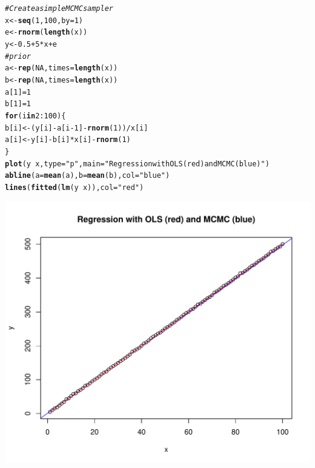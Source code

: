 \documentclass[12pt, a4paper, oneside]{article}\usepackage[]{graphicx}\usepackage[]{color}
\makeatletter
\def\maxwidth{ %
  \ifdim\Gin@nat@width>\linewidth
    \linewidth
  \else
    \Gin@nat@width
  \fi
}
\newcommand{\hlnum}[1]{\textcolor[rgb]{0.686,0.059,0.569}{#1}}%
\newcommand{\hlstr}[1]{\textcolor[rgb]{0.192,0.494,0.8}{#1}}%
\newcommand{\hlcom}[1]{\textcolor[rgb]{0.678,0.584,0.686}{\textit{#1}}}%
\newcommand{\hlopt}[1]{\textcolor[rgb]{0,0,0}{#1}}%
\newcommand{\hlstd}[1]{\textcolor[rgb]{0.345,0.345,0.345}{#1}}%
\newcommand{\hlkwa}[1]{\textcolor[rgb]{0.161,0.373,0.58}{\textbf{#1}}}%
\newcommand{\hlkwb}[1]{\textcolor[rgb]{0.69,0.353,0.396}{#1}}%
\newcommand{\hlkwc}[1]{\textcolor[rgb]{0.333,0.667,0.333}{#1}}%
\newcommand{\hlkwd}[1]{\textcolor[rgb]{0.737,0.353,0.396}{\textbf{#1}}}%
\newenvironment{kframe}{%
 \def\at@end@of@kframe{}%
 \ifinner\ifhmode%
  \def\at@end@of@kframe{\end{minipage}}%
  \begin{minipage}{\columnwidth}%
 \fi\fi%
 \def\FrameCommand##1{\hskip\@totalleftmargin \hskip-\fboxsep
 \colorbox{shadecolor}{##1}\hskip-\fboxsep
     \hskip-\linewidth \hskip-\@totalleftmargin \hskip\columnwidth}%
 \MakeFramed {\advance\hsize-\width
   \@totalleftmargin\z@ \linewidth\hsize
   \@setminipage}}%
 {\par\unskip\endMakeFramed%
 \at@end@of@kframe}
\newenvironment{knitrout}{}{} %
\makeatother
\begin{document}
\begin{knitrout}
\color{fgcolor}\begin{kframe}
\begin{alltt}
\hlcom{# Create a simple MCMC sampler}
\hlstd{x} \hlkwb{<-} \hlkwd{seq}\hlstd{(}\hlnum{1}\hlstd{,} \hlnum{100}\hlstd{,} \hlkwc{by} \hlstd{=} \hlnum{1}\hlstd{)}
\hlstd{e} \hlkwb{<-} \hlkwd{rnorm}\hlstd{(}\hlkwd{length}\hlstd{(x))}
\hlstd{y} \hlkwb{<-} \hlnum{0.5} \hlopt{+} \hlnum{5} \hlopt{*} \hlstd{x} \hlopt{+} \hlstd{e}
\hlcom{# prior}
\hlstd{a} \hlkwb{<-} \hlkwd{rep}\hlstd{(}\hlnum{NA}\hlstd{,} \hlkwc{times} \hlstd{=} \hlkwd{length}\hlstd{(x))}
\hlstd{b} \hlkwb{<-} \hlkwd{rep}\hlstd{(}\hlnum{NA}\hlstd{,} \hlkwc{times} \hlstd{=} \hlkwd{length}\hlstd{(x))}
\hlstd{a[}\hlnum{1}\hlstd{]} \hlkwb{=} \hlnum{1}
\hlstd{b[}\hlnum{1}\hlstd{]} \hlkwb{=} \hlnum{1}
\hlkwa{for} \hlstd{(i} \hlkwa{in} \hlnum{2}\hlopt{:}\hlnum{100}\hlstd{) \{}
    \hlstd{b[i]} \hlkwb{<-} \hlstd{(y[i]} \hlopt{-} \hlstd{a[i} \hlopt{-} \hlnum{1}\hlstd{]} \hlopt{-} \hlkwd{rnorm}\hlstd{(}\hlnum{1}\hlstd{))}\hlopt{/}\hlstd{x[i]}
    \hlstd{a[i]} \hlkwb{<-} \hlstd{y[i]} \hlopt{-} \hlstd{b[i]} \hlopt{*} \hlstd{x[i]} \hlopt{-} \hlkwd{rnorm}\hlstd{(}\hlnum{1}\hlstd{)}
\hlstd{\}}
\hlkwd{plot}\hlstd{(y} \hlopt{~} \hlstd{x,} \hlkwc{type} \hlstd{=} \hlstr{"p"}\hlstd{,} \hlkwc{main} \hlstd{=} \hlstr{"Regression with OLS (red) and MCMC (blue)"}\hlstd{)}
\hlkwd{abline}\hlstd{(}\hlkwc{a} \hlstd{=} \hlkwd{mean}\hlstd{(a),} \hlkwc{b} \hlstd{=} \hlkwd{mean}\hlstd{(b),} \hlkwc{col} \hlstd{=} \hlstr{"blue"}\hlstd{)}
\hlkwd{lines}\hlstd{(}\hlkwd{fitted}\hlstd{(}\hlkwd{lm}\hlstd{(y} \hlopt{~} \hlstd{x)),} \hlkwc{col} \hlstd{=} \hlstr{"red"}\hlstd{)}
\end{alltt}
\end{kframe}
\includegraphics[width=\maxwidth]{figure/MCMC} 

\end{knitrout}
\end{document}
